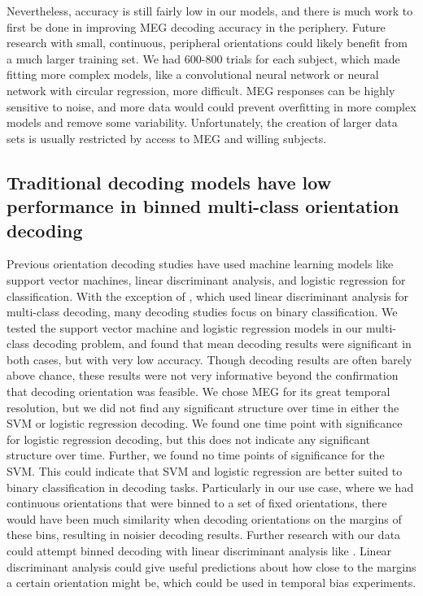 \documentclass[../main.tex]{subfiles}
\begin{document}
Nevertheless, accuracy is still fairly low in our models, and there is much work to first be done in improving MEG decoding accuracy in the periphery. Future research with small, continuous, peripheral orientations could likely benefit from a much larger training set. We had 600-800 trials for each subject, which made fitting more complex models, like a convolutional neural network or neural network with circular regression, more difficult. MEG responses can be highly sensitive to noise, and more data would could prevent overfitting in more complex models and remove some variability. Unfortunately, the creation of larger data sets is usually restricted by access to MEG and willing subjects.

\subsection{Traditional decoding models have low performance in binned multi-class orientation decoding}
Previous orientation decoding studies \citep{kamitani_tong_2005, haynes_rees_2005, cichy_ramirez_pantazis_2015} have used machine learning models like support vector machines, linear discriminant analysis, and logistic regression for classification. With the exception of \cite{kamitani_tong_2005}, which used linear discriminant analysis for multi-class decoding, many decoding studies focus on binary classification. We tested the support vector machine and logistic regression models in our multi-class decoding problem, and found that mean decoding results were significant in both cases, but with very low accuracy. Though decoding results are often barely above chance, these results were not very informative beyond the confirmation that decoding orientation was feasible. We chose MEG for its great temporal resolution, but we did not find any significant structure over time in either the SVM or logistic regression decoding. We found one time point with significance for logistic regression decoding, but this does not indicate any significant structure over time. Further, we found no time points of significance for the SVM. This could indicate that SVM and logistic regression are better suited to binary classification in decoding tasks. Particularly in our use case, where we had continuous orientations that were binned to a set of fixed orientations, there would have been much similarity when decoding orientations on the margins of these bins, resulting in noisier decoding results. Further research with our data could attempt binned decoding with linear discriminant analysis like \cite{kamitani_tong_2005}. Linear discriminant analysis could give useful predictions about how close to the margins a certain orientation might be, which could be used in temporal bias experiments.
\end{document}
